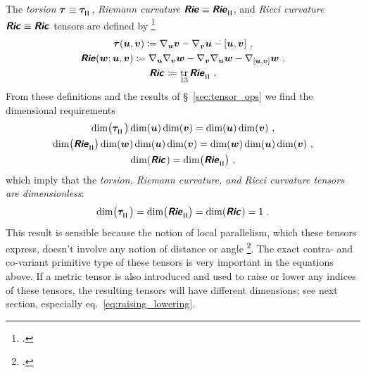 \documentclass[\ifafour a4paper,12pt,\else a5paper,10pt,\fi%
onecolumn,oneside,article,%
british%
]{memoir}
\makeatletter
\theoremstyle{remark}
\theoremstyle{innote}
\newcommand*{\mathte}[1]{\textbf{\textit{\textsf{#1}}}}
\newcommand*{\citep}{\footcites}
\DeclareMathOperator{\tr}{tr}%
\newcommand*{\defd}{\coloneqq}
\DeclarePairedDelimiter\clcl{[}{]}
\renewcommand*{\|}[1][]{\nonscript\,#1\vert\nonscript\;\mathopen{}}
\newcommand*{\sect}{\S}%
\newcommand*{\eqn}{eq.}%
\newcommand*{\cf}{{cf.}}
\newcommand*{\q}{}%
\DeclareRobustCommand*{\q}{%
  \mathord{\mathpalette\bigcdot@{}}%
}
\newcommand*{\bigcdot@scalefactor}{0.7}
\newcommand*{\bigcdot@widthfactor}{1.5}
\newcommand*{\bigcdot@}[2]{%
  \sbox0{$#1\vcenter{}$}%
  \sbox2{$#1\cdot\m@th$}%
  \hbox to \bigcdot@widthfactor\wd2{%
    \hfil
    \raise\ht0\hbox{%
      \scalebox{\bigcdot@scalefactor}{%
        \lower\ht0\hbox{$#1\bullet\m@th$}%
      }%
    }%
    \hfil
  }%
}
\newcommand*{\Un}{\textsf{1}}
\newcommand*{\yR}{\mathte{Rie}}
\newcommand*{\yRi}{\mathte{Ric}}
\newcommand*{\yTo}{\bm{\tau}}
\newcommand*{\yv}{\bm{v}}
\newcommand*{\yu}{\bm{u}}
\newcommand*{\yw}{\bm{w}}
\renewcommand*{\i}{\indices}
\newcommand*{\nab}{\nabla}
\newcommand*{\rul}{{\mkern2mu\rule[-0.1ex]{0.75pt}{1.1ex}\mkern2mu}}
\DeclarePairedDelimiter\mul{\rul}{\rul}%
\makeatother
\begin{document}
The \emph{torsion} $\yTo \equiv \yTo\i{^{\q}_{\mul{\q\q}}}$, \emph{Riemann
  curvature} $\yR \equiv \yR\i{^{\q}_{\q\mul{\q\q}}}$, and \emph{Ricci
  curvature} $\yRi \equiv \yRi\i{_{\q\q}}$ tensors are defined by
\citep[\sect~V.B.1]{choquetbruhatetal1977_r1996}
\begin{gather}
  \label{eq:torsion_eq}
\yTo(\yu,\yv) \defd \nab_{\yu}\yv - \nab_{\yv}\yu - \clcl{\yu,\yv}\ ,
\\
\yR(\yw;\yu,\yv) \defd
\nab_{\yu}\nab_{\yv}\yw - \nab_{\yv}\nab_{\yu}\yw
- \nab_{\clcl{\yu,\yv}}\yw\ ,
  \label{eq:riemann_eq}  
\\
\yRi\i{_{\q\q}} \defd \tr_{13} \yR\i{^{\q}_{\q\mul{\q\q}}} \ .
  \label{eq:ricci_eq}  
\end{gather}
From these definitions and the results of \sect~\ref{sec:tensor_ops} we
find the dimensional requirements
\begin{gather}
  \label{eq:torsion_eq_dim}
\dim\bigl(\yTo\i{^{\q}_{\mul{\q\q}}}\bigr)\dim(\yu)\dim(\yv) = \dim(\yu) \dim(\yv)\ ,
\\
\dim\bigl(\yR\i{^{\q}_{\q\mul{\q\q}}}\bigr)\dim(\yw)\dim(\yu)\dim(\yv) =
\dim(\yw)\dim(\yu)\dim(\yv)\ ,
\label{eq:riemann_eq_dim}
\\
\dim(\yRi\i{_{\q\q}}) = \dim\bigl(\yR\i{^{\q}_{\q\mul{\q\q}}}\bigr)\ ,
  \label{eq:ricci_eq_dim}  
\end{gather}
which imply that the \emph{torsion, Riemann curvature, and Ricci curvature
  tensors are dimensionless}:
\begin{equation}
  \label{eq:dim_torsion_riemann_ricci}
  \dim\bigl(\yTo\i{^{\q}_{\mul{\q\q}}}\bigr) =
   \dim\bigl(\yR\i{^{\q}_{\q\mul{\q\q}}}\bigr) =
   \dim(\yRi\i{_{\q\q}}) =\Un\ .
\end{equation}
This result is sensible because the notion of local parallelism, which
these tensors express, doesn't involve any notion of distance or angle
\citep[\cf][]{portamana2011_r2019}. The exact contra- and co-variant
primitive type of these tensors is very important in the equations above.
If a metric tensor is also introduced and used to raise or lower any
indices of these tensors, the resulting tensors will have different
dimensions; see next section, especially \eqn~\eqref{eq:raising_lowering}.
\end{document}
